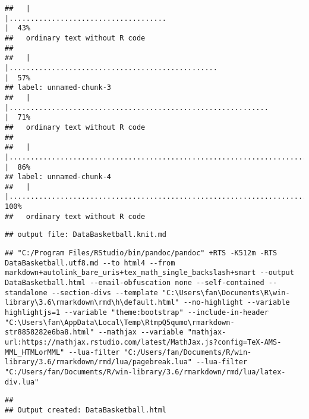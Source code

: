 \documentclass[
]{article}
\begin{document}
\begin{verbatim}
##   |                                                                                              |.....................................                                                 |  43%
##   ordinary text without R code
## 
##   |                                                                                              |.................................................                                     |  57%
## label: unnamed-chunk-3
##   |                                                                                              |.............................................................                         |  71%
##   ordinary text without R code
## 
##   |                                                                                              |..........................................................................            |  86%
## label: unnamed-chunk-4
##   |                                                                                              |......................................................................................| 100%
##   ordinary text without R code
\end{verbatim}

\begin{verbatim}
## output file: DataBasketball.knit.md
\end{verbatim}

\begin{verbatim}
## "C:/Program Files/RStudio/bin/pandoc/pandoc" +RTS -K512m -RTS DataBasketball.utf8.md --to html4 --from markdown+autolink_bare_uris+tex_math_single_backslash+smart --output DataBasketball.html --email-obfuscation none --self-contained --standalone --section-divs --template "C:\Users\fan\Documents\R\win-library\3.6\rmarkdown\rmd\h\default.html" --no-highlight --variable highlightjs=1 --variable "theme:bootstrap" --include-in-header "C:\Users\fan\AppData\Local\Temp\RtmpQ5qumo\rmarkdown-str8858282e6ba8.html" --mathjax --variable "mathjax-url:https://mathjax.rstudio.com/latest/MathJax.js?config=TeX-AMS-MML_HTMLorMML" --lua-filter "C:/Users/fan/Documents/R/win-library/3.6/rmarkdown/rmd/lua/pagebreak.lua" --lua-filter "C:/Users/fan/Documents/R/win-library/3.6/rmarkdown/rmd/lua/latex-div.lua"
\end{verbatim}

\begin{verbatim}
## 
## Output created: DataBasketball.html
\end{verbatim}
\end{document}
